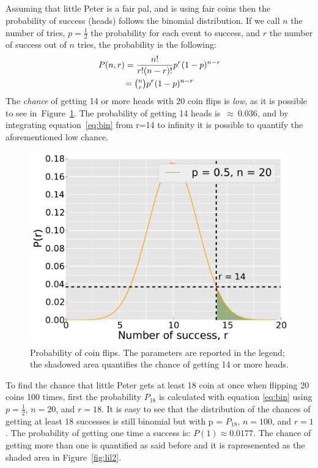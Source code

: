 \documentclass[twocolumn]{article}
\begin{document}
	\subsection{} %
	\label{sub:}
	Assuming that little Peter is a fair pal, and is using fair coins then the probability of success (heads) follows the binomial distribution.
	If we call $n$ the number of tries, $p= \frac{1}{2}$ the probability for each event to success, and $r$ the number of success out of $n$ tries, the probability is the following: 
	\begin{multline}
	\label{eq:bin}
		P (n,r) = \frac{n!}{r!(n-r)!} p ^ r (1-p)^{n-r} \\ 
		 = \tbinom n r p ^ r (1-p)^{n-r}
	\end{multline}
	The \emph{chance} of getting 14 or more heads with 20 coin flips is \emph{low}, as it is possible to see in~Figure~\ref{fig:lil}. The probability of getting 14 heads is~$\approx~0.036$, and by integrating equation~\ref{eq:bin} from r=14 to infinity it is possible to quantify the aforementioned low chance.
	\begin{figure}[h]
		\begin{center}
			\includegraphics[width=.4\textwidth]{fig/lil.pdf}
		\end{center}
		\caption{Probability of coin flips. The parameters are reported in the legend; the shadowed area quantifies the chance of getting 14 or more heads.}
		\label{fig:lil}
	\end{figure}


	To find the chance that little Peter gets at least 18 coin at once when flipping 20 coins 100 times, first the probability $P_{18}$ is calculated with equation \ref{eq:bin} using $p= \frac{1}{2}$, $n=20$, and $r=18$.
	It is easy to see that the distribution of the chances of getting at least 18 successes is still binomial but with p = $P_{18}$, $n=100$, and $r=1$.
	The probability of getting one time a success is: $P(1) \approx 0.0177$. The chance of getting more than one is quantified as said before and it is rapresenented as the shaded area in Figure~\ref{fig:lil2}.
\end{document}
